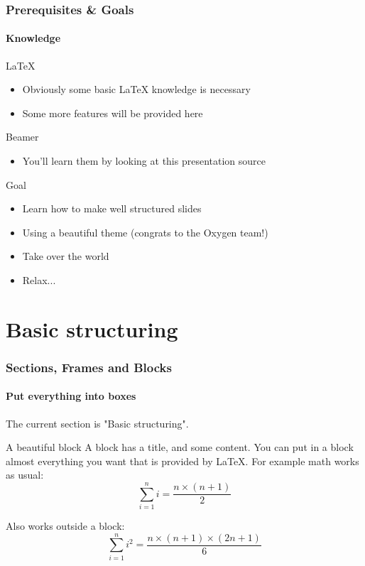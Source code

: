 \documentclass{article}
\begin{document}
\begin{frame}
  \frametitle{Prerequisites \& Goals}
  \framesubtitle{Knowledge}
  \begin{block}{LaTeX}
  \begin{itemize}
    \item Obviously some basic LaTeX knowledge is necessary
    \item Some more features will be provided here
  \end{itemize}
  \end{block}

  \begin{block}{Beamer}
  \begin{itemize}
    \item You'll learn them by looking at this presentation source
  \end{itemize}
  \end{block}

  \begin{block}{Goal}
  \begin{itemize}
    \item Learn how to make well structured slides
    \item Using a beautiful theme (congrats to the Oxygen team!)
    \item Take over the world
    \item Relax...
  \end{itemize}
  \end{block}
\end{frame}

\section{Basic structuring}
\begin{frame}
  \frametitle{Sections, Frames and Blocks}
  \framesubtitle{Put everything into boxes}

  The current section is "Basic structuring". 

  \begin{block}{A beautiful block}
  A block has a title, and some content. You can put in a block
  almost everything you want that is provided by LaTeX. For example
  math works as usual:
    \begin{equation}
    \sum_{i=1}^n i = \frac{n \times (n+1)}{2}
    \end{equation}
  \end{block}

  Also works outside a block:
  \begin{equation}
  \sum_{i=1}^n i^2 = \frac{n \times (n+1) \times (2n+1)}{6}
  \end{equation}
\end{frame}
\end{document}
